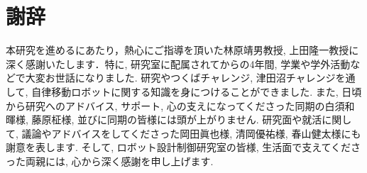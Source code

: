 \chapter*{謝辞}

本研究を進めるにあたり，熱心にご指導を頂いた林原靖男教授, 上田隆一教授に深く感謝いたします．特に, 研究室に配属されてからの4年間, 学業や学外活動などで大変お世話になりました. 研究やつくばチャレンジ, 津田沼チャレンジを通して, 自律移動ロボットに関する知識を身につけることができました. また, 日頃から研究へのアドバイス, サポート, 心の支えになってくださった同期の白須和暉様, 藤原柾様, 並びに同期の皆様には頭が上がりません. 研究面や就活に関して, 議論やアドバイスをしてくださった岡田眞也様, 清岡優祐様, 春山健太様にも謝意を表します. そして, ロボット設計制御研究室の皆様, 生活面で支えてくださった両親には, 心から深く感謝を申し上げます. 
%

